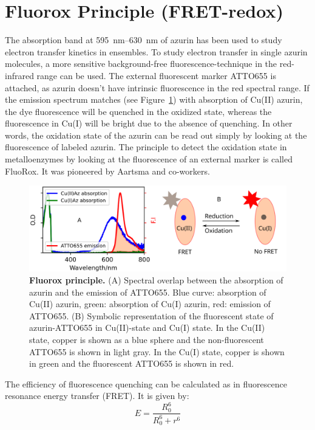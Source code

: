 \section{Fluorox Principle (FRET-redox)}
The absorption band at \SIrange{595}{630}{\nm} of azurin has been used to study electron transfer kinetics in ensembles.
To study electron transfer in single azurin molecules, a more sensitive background-free fluorescence-technique in the red-infrared range can be used.
The external fluorescent marker ATTO655 is attached, as azurin doesn't have intrinsic fluorescence in the red spectral range.
If the emission spectrum matches (see Figure~\ref{fig:flurox_azurin}) with absorption of Cu(II) azurin, the dye fluorescence will be quenched in the oxidized state, whereas the fluorescence in Cu(I) will be bright due to the absence of quenching.
In other words, the oxidation state of the azurin can be read out simply by looking at the fluorescence of labeled azurin.
The principle to detect the oxidation state in metalloenzymes by looking at the fluorescence of an external marker is called FluoRox. It was pioneered by Aartsma and co-workers.\cite{kuznetsova2008the,goldsmith2011redox,tabares2011fluorescence}
\begin{figure}
	\centering
	\includegraphics[width=\textwidth]{flurox_azurin}
	\caption{\textbf{Fluorox principle.} (A) Spectral overlap between the absorption of azurin and the emission of ATTO655. Blue curve: absorption of Cu(II) azurin, green: absorption of Cu(I) azurin, red: emission of ATTO655.
	(B) Symbolic representation of the fluorescent state of azurin-ATTO655 in Cu(II)-state and Cu(I) state. In the Cu(II) state, copper is shown as a blue sphere and the non-fluorescent ATTO655 is shown in light gray. In the Cu(I) state, copper is shown in green and the fluorescent ATTO655 is shown in red.}
	\label{fig:flurox_azurin}
\end{figure}
The efficiency of fluorescence quenching can be calculated as in fluorescence resonance energy transfer (FRET). It is given by:
\begin{equation}
	E = \frac{R_0^6}{R_0^6 + r^6}	
\end{equation}
